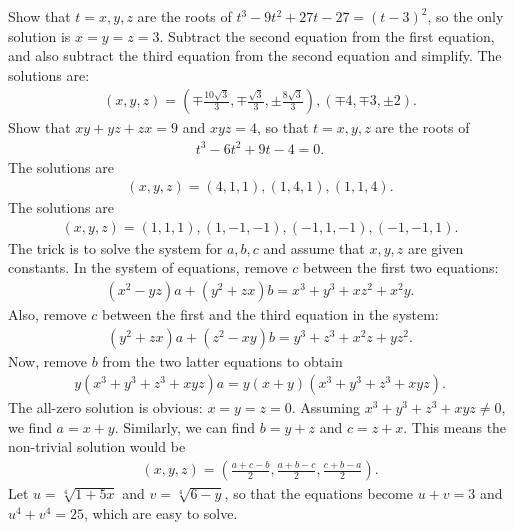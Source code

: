 \documentclass[12pt,a4paper]{memoir}
\theoremstyle{definition}
\begin{document}
\begin{solution}
	\begin{tasks}
		\task Show that $t=x,y,z$ are the roots of $t^3-9t^2+27t-27=(t-3)^2$, so the only solution is $x=y=z=3$.
		\task Subtract the second equation from the first equation, and also subtract the third equation from the second equation and simplify. The solutions are:
		\begin{align*}
			(x,y,z)= \left(\mp\frac{10\sqrt 3}{3}, \mp \frac{\sqrt 3}{3}, \pm\frac{8\sqrt{3}}{3}\right), (\mp 4, \mp 3, \pm 2).
		\end{align*}
		\task Show that $xy+yz+zx=9$ and $xyz=4$, so that $t=x,y,z$ are the roots of
		\begin{align*}
			t^3-6t^2+9t-4=0.
		\end{align*}
		The solutions are
		\begin{align*}
			(x,y,z)=(4,1,1), (1,4,1), (1,1,4).
		\end{align*}
		\task The solutions are
		\begin{align*}
			(x,y,z)= (1,1,1), (1,-1,-1), (-1,1,-1), (-1,-1,1).
		\end{align*}
		\task The trick is to solve the system for $a,b,c$ and assume that $x,y,z$ are given constants. In the system of equations, remove $c$ between the first two equations:
		\begin{align*}
			(x^2-yz)a+(y^2+zx)b = x^3 + y^3 + xz^2 + x^2y.
		\end{align*}
		Also, remove $c$ between the first and the third equation in the system:
		\begin{align*}
			(y^2+zx)a+(z^2-xy)b = y^3+z^3+x^2z+yz^2.
		\end{align*}
		Now, remove $b$ from the two latter equations to obtain
		\begin{align*}
			y(x^3+y^3+z^3+xyz)a = y(x+y)(x^3+y^3+z^3+xyz).
		\end{align*}
		The all-zero solution is obvious: $x=y=z=0$. Assuming $x^3+y^3+z^3+xyz\neq 0$, we find $a=x+y$. Similarly, we can find $b=y+z$ and $c=z+x$. This means the non-trivial solution would be
		\begin{align*}
			(x,y,z) = \left(\frac{a+c-b}{2}, \frac{a+b-c}{2}, \frac{c+b-a}{2}\right).
		\end{align*}
		\task Let $u=\sqrt[4]{1+5x}$ and $v=\sqrt[4]{6-y}$, so that the equations become $u+v=3$ and $u^4+v^4=25$, which are easy to solve.
	\end{tasks}
\end{solution}
\end{document}
